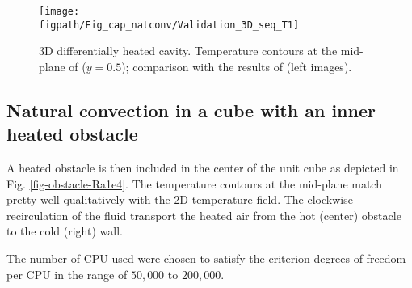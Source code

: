 \begin{figure}[!ht]
\begin{minipage}{\linewidth}
\begin{center}
 {\texttt{[image: \\figpath/Fig\_cap\_natconv/Validation\_3D\_seq\_T1]}}
\end{center}
\end{minipage}
\caption{3D differentially heated cavity. Temperature contours at the mid-plane of ($y=0.5$); comparison with the results of \cite{Wakashima-2004} (left images). }
\label{fig-3DT} 
\end{figure}

\subsection{Natural convection in a cube with an inner heated obstacle}\label{sub-OBSTACLE-3D}
A heated obstacle is then included in the center of the unit cube as depicted in Fig. \ref{fig-obstacle-Ra1e4}.
The temperature contours at the mid-plane match pretty well qualitatively with the 2D temperature field.
The clockwise recirculation of the fluid transport the heated air from the hot (center) obstacle to the cold (right) wall.


The number of CPU used were chosen to satisfy the criterion degrees of freedom per CPU in the range of $50,000$ to $200,000$.

